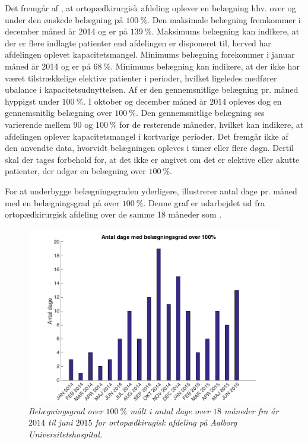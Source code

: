 \noindent
Det fremgår af , at ortopædkirurgisk afdeling oplever en belægning hhv. over og under den ønskede belægning på $100~\%$. Den maksimale belægning fremkommer i december måned år 2014 og er på $139~\%$. Maksimums belægning kan indikere, at der er flere indlagte patienter end afdelingen er disponeret til, herved har afdelingen oplevet kapacitetsmangel. Minimums belægning forekommer i januar måned år 2014 og er på $68~\%$. Minimums belægning kan indikere, at der ikke har været tilstrækkelige elektive patienter i perioder, hvilket ligeledes medfører ubalance i kapacitetsudnyttelsen. Af  er den gennemsnitlige belægning pr. måned hyppigst under $100~\%$. I oktober og december måned år $2014$ opleves dog en gennemsnitlig belægning over $100~\%$. Den gennemsnitlige belægning ses varierende mellem $90$ og $100~\%$ for de resterende måneder, hvilket kan indikere, at afdelingen oplever kapacitetsmangel i kortvarige perioder.\cite{SDS2015} 
Det fremgår ikke af den anvendte data, hvorvidt belægningen opleves i timer eller flere døgn. Dertil skal der tages forbehold for, at det ikke er angivet om det er elektive eller akutte patienter, der udgør en belægning over $100~\%$.\cite{SDS2015} 
 
For at underbygge belægningsgraden yderligere, illustrerer  antal dage pr. måned med en belægningsgrad på over $100~\%$. Denne graf er udarbejdet ud fra ortopædkirurgisk afdeling over de samme 18 måneder som . \cite{SDS2015} 

\begin{figure}[H]
	\flushleft 
	\centering
	\includegraphics[scale=.4]{figures/antaldage.png}
	\flushleft
	\caption{\textit{Belægningsgrad over $100~\%$ målt i antal dage over $18$ måneder fra år $2014$ til juni $2015$ for ortopædkirugisk afdeling på Aalborg Universitetshospital.}\cite{SDS2015}}
	\label{antaldage}
\end{figure}

